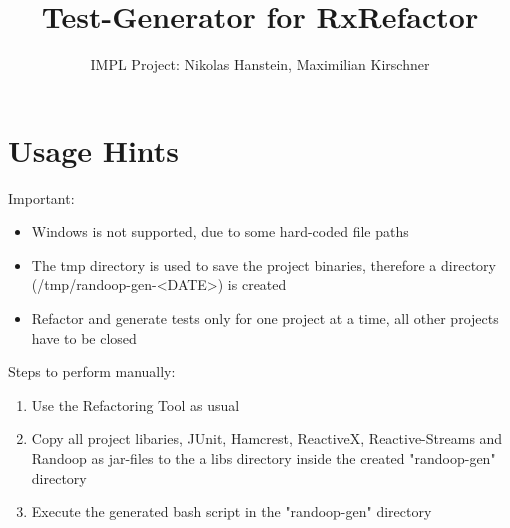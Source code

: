 \documentclass[accentcolor=tud9c, colorback]{tudreport}
\title{Test-Generator for RxRefactor}
\subtitle{IMPL Project: Nikolas Hanstein, Maximilian Kirschner}
\begin{document}
	\maketitle
	\chapter{Usage Hints}
		Important:
		\begin{itemize}
			\item Windows is not supported, due to some hard-coded file paths
			\item The tmp directory is used to save the project binaries, therefore a directory (/tmp/randoop-gen-<DATE>) is created
			\item Refactor and generate tests only for one project at a time, all other projects have to be closed
		\end{itemize}
		Steps to perform manually:
		\begin{enumerate}
			\item Use the Refactoring Tool as usual
			\item Copy all project libaries, JUnit, Hamcrest, ReactiveX, Reactive-Streams and Randoop as jar-files to the a libs directory inside the created "randoop-gen" directory
			\item Execute the generated bash script in the "randoop-gen" directory
		\end{enumerate}
		
\end{document}
